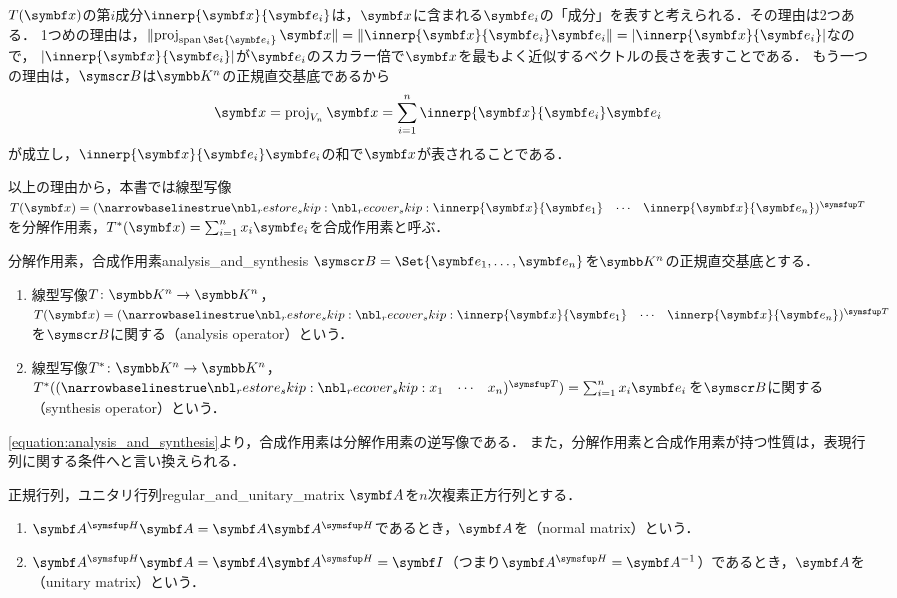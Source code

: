 \documentclass[../../main]{subfiles}
\begin{document}
\(T(\vect{x})\)の第\(i\)成分\(\innerp{\vect{x}}{\vect{e}_i}\)は，\(\vect{x}\)に含まれる\(\vect{e}_i\)の「成分」を表すと考えられる．その理由は2つある．
1つめの理由は，\(\vnorm{\proj_{\spannedby\Set{\vect{e}_i}}\vect{x}}=\vnorm{\innerp{\vect{x}}{\vect{e}_i}\vect{e}_i}=\abs{\innerp{\vect{x}}{\vect{e}_i}}\)なので，
\(\abs{\innerp{\vect{x}}{\vect{e}_i}}\)が\(\vect{e}_i\)のスカラー倍で\(\vect{x}\)を最もよく近似するベクトルの長さを表すことである．
もう一つの理由は，\(\basis{B}\)は\(\numset{K}^n\)の正規直交基底であるから
\begin{equation}
  \label{equation:analysis_and_synthesis}
  \vect{x} = \proj_{V_n}\vect{x}
  = \sum_{i=1}^n\innerp{\vect{x}}{\vect{e}_i}\vect{e}_i
\end{equation}
が成立し，\(\innerp{\vect{x}}{\vect{e}_i}\vect{e}_i\)の和で\(\vect{x}\)が表されることである．

以上の理由から，本書では線型写像\(T(\vect{x})=\trps{\rowvect{\innerp{\vect{x}}{\vect{e}_1} & \cdots & \innerp{\vect{x}}{\vect{e}_n}}}\)を分解作用素，\(\synth{T}(\vect{x})=\sum_{i=1}^nx_i\vect{e}_i\)を合成作用素と呼ぶ．

\begin{definition}{分解作用素，合成作用素}{analysis_and_synthesis}
  \(\basis{B}=\Set{\vect{e}_1,\dots,\vect{e}_n}\)を\(\numset{K}^n\)の正規直交基底とする．
  \begin{enumerate}
    \item 線型写像\(T\colon\numset{K}^n\to\numset{K}^n\)，\(T(\vect{x})=\trps{\rowvect{\innerp{\vect{x}}{\vect{e}_1} & \cdots & \innerp{\vect{x}}{\vect{e}_n}}}\)を\(\basis{B}\)に関する（analysis operator）という．
    \item 線型写像\(\synth{T}\colon\numset{K}^n\to\numset{K}^n\)，\(\synth{T}(\trps{\rowvect{x_1 & \cdots & x_n}})=\sum_{i=1}^nx_i\vect{e}_i\)を\(\basis{B}\)に関する（synthesis operator）という．
  \end{enumerate}
\end{definition}

\cref{equation:analysis_and_synthesis}より，合成作用素は分解作用素の逆写像である．
また，分解作用素と合成作用素が持つ性質は，表現行列に関する条件へと言い換えられる．

\begin{definition}{正規行列，ユニタリ行列}{regular_and_unitary_matrix}
  \(\mat{A}\)を\(n\)次複素正方行列とする．
  \begin{enumerate}
    \item \(\htrps{\mat{A}}\mat{A}=\mat{A}\htrps{\mat{A}}\)であるとき，\(\mat{A}\)を（normal matrix）という．
    \item \(\htrps{\mat{A}}\mat{A}=\mat{A}\htrps{\mat{A}}=\imat\)（つまり\(\htrps{\mat{A}}=\mat{A}^{-1}\)）であるとき，\(\mat{A}\)を（unitary matrix）という．
  \end{enumerate}
\end{definition}
\end{document}
